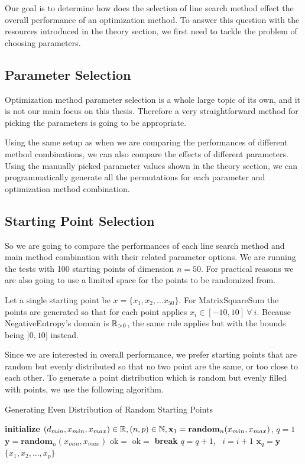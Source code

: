 \documentclass[a4paper,english,titlepage,12pt]{article}
\newcommand{\vect}[1]{\ensuremath{\mathbf{#1}}}
\newcommand{\norm}[1]{\ensuremath\Vert #1 \Vert}
\newcommand{\R}{\ensuremath\mathbb{R}}
\newcommand{\N}{\ensuremath\mathbb{N}}
\begin{document}
Our goal is to determine how does the selection of line search method effect the overall performance of an optimization method. To answer this question with the resources introduced in the theory section, we first need to tackle the problem of choosing parameters.


\subsection{Parameter Selection}

Optimization method parameter selection is a whole large topic of its own, and it is not our main focus on this thesis. Therefore a very straightforward method for picking the parameters is going to be appropriate.

Using the same setup as when we are comparing the performances of different method combinations, we can also compare the effects of different parameters. Using the manually picked parameter values shown in the theory section, we can programmatically generate all the permutations for each parameter and optimization method combination.

\subsection{Starting Point Selection}

So we are going to compare the performances of each line search method and main method combination with their related parameter options. We are running the tests with 100 starting points of dimension $n = 50$. For practical reasons we are also going to use a limited space for the points to be randomized from.

Let a single starting point be $x = \{x_1, x_2, \dots x_{50}\}$. For MatrixSquareSum the points are generated so that for each point applies $x_i \in  [-10, 10]\ \forall\ i$. Because NegativeEntropy's domain is $\R_{>0}$, the same rule applies but with the bounds being $]0, 10]$ instead.

Since we are interested in overall performance, we prefer starting points that are random but evenly distributed so that no two point are the same, or too close to each other. To generate a point distribution which is random but evenly filled with points, we use the following algorithm.

\begin{algorithm}[H]
\caption{Generating Even Distribution of Random Starting Points}
\label{alg_x0_distribution}
\begin{algorithmic}[1]
\STATE \textbf{initialize} $(d_{min}, x_{min}, x_{max}) \in \R, (n, p) \in \N, \vect{x}_1 = \mathbf{random}_{n}(x_{min}, x_{max})$, $q = 1$
    \STATE $\vect{y} = \mathbf{random}_{n}(x_{min}, x_{max})$
    \STATE $\mathrm{ok} =$ \TRUE
        \IF{$\norm{\vect{x}_j - \vect{y}} < d_{min}$}
            \STATE $\mathrm{ok} = $ \FALSE
            \STATE \textbf{break}
        \ENDIF
    \ENDFOR
        \STATE $q = q + 1$, \ $i = i + 1$
        \STATE $\vect{x}_q = \vect{y}$
    \ENDIF
\ENDWHILE
\RETURN $\{ x_1, x_2, ..., x_p\}$
\end{algorithmic}
\end{algorithm}
\end{document}
